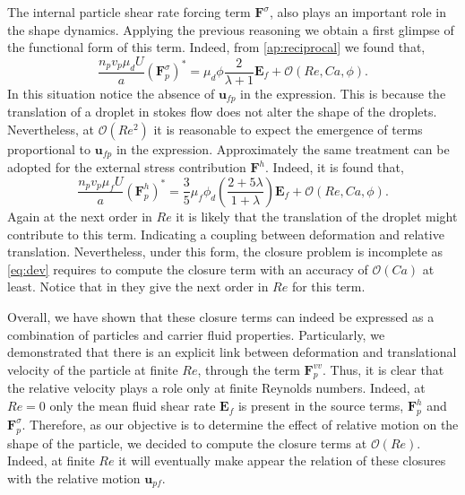 The internal particle shear rate forcing term $\textbf{F}^\sigma$, also plays an important role in the shape dynamics. 
Applying the previous reasoning we obtain a first glimpse of the functional form of this term. 
Indeed, from \ref{ap:reciprocal} we found that, 
\begin{equation*}
    \frac{n_p v_p  \mu_d U}{a}(\textbf{F}_p^{\sigma})^*
    = \mu_d \phi \frac{ 2 }{\lambda+1}
    \textbf{E}_f
    + \mathcal{O}(Re,Ca,\phi). 
\end{equation*}
In this situation notice the absence of $\textbf{u}_{fp}$ in the expression.
This is because the translation of a droplet in stokes flow does not alter the shape of the droplets. 
Nevertheless, at $\mathcal{O}(Re^2)$ it is reasonable to expect the emergence of terms proportional to $\textbf{u}_{fp}$ in the expression.
Approximately the same treatment can be adopted for the external stress contribution $\textbf{F}^h$. 
Indeed, it is found that, 
\begin{equation}
    \frac{n_p v_p \mu_f U}{a}
    (\textbf{F}^h_p)^*
    = 
    \frac{3}{5}\mu_f \phi_d \left(\frac{2+5\lambda}{1+\lambda}\right)
    \textbf{E}_f
    + \mathcal{O}(Re,Ca,\phi).
    \label{eq:closure_stress}
\end{equation}
Again at the next order in $Re$ it is likely that the translation of the droplet might contribute to this term. 
Indicating a coupling between deformation and relative translation. 
Nevertheless, under this form, the closure problem is incomplete as \ref{eq:dev} requires to compute the closure term with an accuracy of $\mathcal{O}(Ca)$ at least. 
Notice that in \citet{raja2010inertial} they give the next order in $Re$ for this term.


Overall, we have shown that these closure terms can indeed be expressed as a combination of particles and carrier fluid properties.
Particularly, we demonstrated that there is an explicit link between deformation and translational velocity of the particle at finite $Re$, through the term $\textbf{F}^{vv}_p$. 
Thus, it is clear that the relative velocity plays a role only at finite Reynolds numbers. 
Indeed, at $Re = 0$ only the mean fluid shear rate $\textbf{E}_f$ is present in the source terms, $\textbf{F}^h_p$ and $\textbf{F}_p^{\sigma}$. 
Therefore, as our objective is to determine the effect of relative motion on the shape of the particle, we decided to compute the closure terms at $\mathcal{O}(Re)$. 
Indeed, at finite $Re$ it will eventually make appear the relation of these closures with the relative motion $\textbf{u}_{pf}$. 


